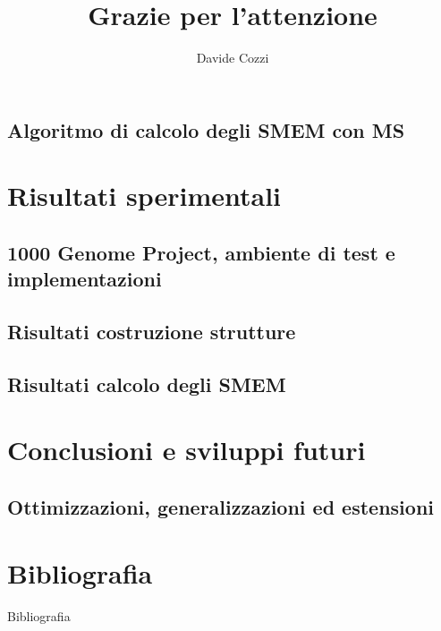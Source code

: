 \documentclass{beamer}
\begin{document}
\subsection{Algoritmo di calcolo degli SMEM con MS}
\section{Risultati sperimentali}
\subsection{1000 Genome Project, ambiente di test e implementazioni}
\subsection{Risultati costruzione strutture}
\subsection{Risultati calcolo degli SMEM}
\section{Conclusioni e sviluppi futuri}
\subsection{Ottimizzazioni, generalizzazioni ed estensioni}
\section{Bibliografia}
\begin{frame}[allowframebreaks]{Bibliografia} 
  
  
\end{frame}
\begin{frame}{}
  
  \title[] {Grazie per l'attenzione}


  \author[1]{\Large{Davide Cozzi}}



  \maketitle
\end{frame}
\end{document}
